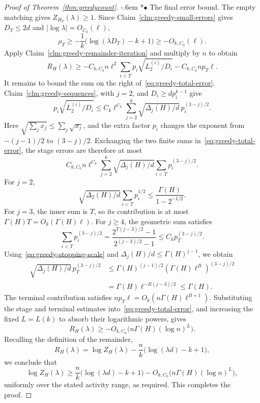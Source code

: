 \documentclass[11pt,reqno]{amsart}
\makeatletter
\numberwithin{equation}{section}
\renewcommand{\paragraph}{\@startsection{paragraph}{4}%
    \z@{.75\linespacing\@plus.2\linespacing\@minus.1\linespacing}%
    {-.6em}%
    {\normalfont\bfseries}}
\newcommand{\proofparagraph}[1]{%
    \paragraph*{$\bullet$ #1}\ignorespaces}
\theoremstyle{plain}
\theoremstyle{definition}
\makeatother
\begin{document}
\begin{proof}[Proof of Theorem~\ref{thm:greedycount}]
    \proofparagraph{The final error bound.}
    The empty matching gives $Z_{H_T}(\lambda)\ge1$.
    Since Claim~\ref{clm:greedy-small-errors} gives $D_T\le2d$ and $|\log\lambda|=O_{C_0}(\ell)$,
    \[
        \rho_T\ge-\frac1k\bigl(\log(\lambda D_T)-k+1\bigr)
        \ge-O_{k,C_0}(\ell).
    \]
    Apply Claim~\ref{clm:greedy-remainder-iteration} and multiply by $n$ to obtain
    \begin{equation}\label{eq:greedy-total-error}
        R_H(\lambda)\ge
        -C_{k,C_0}n\ell^2\sum_{i<T}p_i\sqrt{L_2^{(i)}/D_i}
        -C_{k,C_0}np_T\ell.
    \end{equation}
    It remains to bound the sum on the right of~\eqref{eq:greedy-total-error}. Claim~\ref{clm:greedy-sequences}, with $j=2$, and $D_i\ge dp_i^{k-1}$ give
    \[
        p_i\sqrt{L_2^{(i)}/D_i}
        \le C_k\ell^{C_k}\sum_{j=2}^k
        \sqrt{\Delta_j(H)/d}\,p_i^{(3-j)/2}.
    \]
    Here $\sqrt{\sum_j x_j}\le\sum_j\sqrt{x_j}$, and the extra factor $p_i$ changes the exponent from $-(j-1)/2$ to $(3-j)/2$.
    Exchanging the two finite sums in~\eqref{eq:greedy-total-error}, the stage errors are therefore at most
    \[
        C_{k,C_0}n\ell^{C_k}\sum_{j=2}^k
        \sqrt{\Delta_j(H)/d}\sum_{i<T}p_i^{(3-j)/2}.
    \]
    For $j=2$,
    \[
        \sqrt{\Delta_2(H)/d}\sum_{i<T}p_i^{1/2}
        \le\frac{\Gamma(H)}{1-2^{-1/2}}.
    \]
    For $j=3$, the inner sum is $T$, so its contribution is at most $\Gamma(H)T=O_k(\Gamma(H)\ell)$.
    For $j\ge4$, the geometric sum satisfies
    \[
        \sum_{i<T}p_i^{(3-j)/2}
        =\frac{2^{T(j-3)/2}-1}{2^{(j-3)/2}-1}
        \le C_kp_T^{(3-j)/2}.
    \]
    Using~\eqref{eq:greedy-stopping-scale} and $\Delta_j(H)/d\le\Gamma(H)^{j-1}$, we obtain
    \[
        \begin{aligned}
            \sqrt{\Delta_j(H)/d}\,p_T^{(3-j)/2}
            &\le\Gamma(H)^{(j-1)/2}
            (\Gamma(H)\ell^B)^{(3-j)/2}\\
            &=\Gamma(H)\ell^{-B(j-3)/2}\le\Gamma(H).
        \end{aligned}
    \]
    The terminal contribution satisfies $np_T\ell=O_k(n\Gamma(H)\ell^{B+1})$.
    Substituting the stage and terminal estimates into~\eqref{eq:greedy-total-error}, and increasing the fixed $L=L(k)$ to absorb their logarithmic powers, gives
    \[
        R_H(\lambda)\ge-O_{k,C_0}\bigl(n\Gamma(H)(\log n)^L\bigr).
    \]
    Recalling the definition of the remainder,
    \[
        R_H(\lambda)=\log Z_H(\lambda)
        -\frac nk\bigl(\log(\lambda d)-k+1\bigr),
    \]
    we conclude that
    \[
        \log Z_H(\lambda)\ge\frac nk\bigl(\log(\lambda d)-k+1\bigr)
        -O_{k,C_0}\bigl(n\Gamma(H)(\log n)^L\bigr),
    \]
    uniformly over the stated activity range, as required.
    This completes the proof.
\end{proof}
\end{document}
